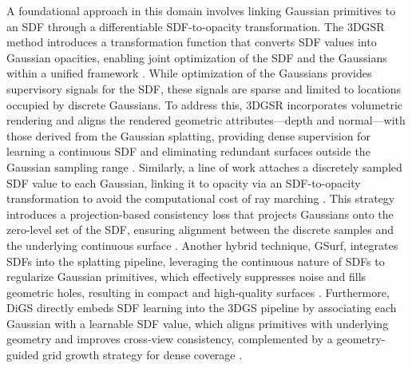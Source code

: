 \documentclass[11pt]{article}
\begin{document}
A foundational approach in this domain involves linking Gaussian primitives to an SDF through a differentiable SDF-to-opacity transformation. The 3DGSR method introduces a transformation function that converts SDF values into Gaussian opacities, enabling joint optimization of the SDF and the Gaussians within a unified framework \cite{ref195}. While optimization of the Gaussians provides supervisory signals for the SDF, these signals are sparse and limited to locations occupied by discrete Gaussians. To address this, 3DGSR incorporates volumetric rendering and aligns the rendered geometric attributes---depth and normal---with those derived from the Gaussian splatting, providing dense supervision for learning a continuous SDF and eliminating redundant surfaces outside the Gaussian sampling range \cite{ref195}. Similarly, a line of work attaches a discretely sampled SDF value to each Gaussian, linking it to opacity via an SDF-to-opacity transformation to avoid the computational cost of ray marching \cite{ref196}. This strategy introduces a projection-based consistency loss that projects Gaussians onto the zero-level set of the SDF, ensuring alignment between the discrete samples and the underlying continuous surface \cite{ref196}. Another hybrid technique, GSurf, integrates SDFs into the splatting pipeline, leveraging the continuous nature of SDFs to regularize Gaussian primitives, which effectively suppresses noise and fills geometric holes, resulting in compact and high-quality surfaces \cite{ref197}. Furthermore, DiGS directly embeds SDF learning into the 3DGS pipeline by associating each Gaussian with a learnable SDF value, which aligns primitives with underlying geometry and improves cross-view consistency, complemented by a geometry-guided grid growth strategy for dense coverage \cite{ref94}.
\end{document}

